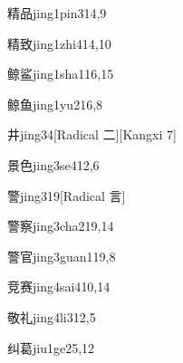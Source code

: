 \begin{verbete}{精品}{jing1pin3}{14,9}
\end{verbete}

\begin{verbete}{精致}{jing1zhi4}{14,10}
\end{verbete}

\begin{verbete}{鲸鲨}{jing1sha1}{16,15}
\end{verbete}

\begin{verbete}{鲸鱼}{jing1yu2}{16,8}
\end{verbete}

\begin{verbete}{井}{jing3}{4}[Radical 二][Kangxi 7]
\end{verbete}

\begin{verbete}{景色}{jing3se4}{12,6}
\end{verbete}

\begin{verbete}{警}{jing3}{19}[Radical 言]
\end{verbete}

\begin{verbete}{警察}{jing3cha2}{19,14}
\end{verbete}

\begin{verbete}{警官}{jing3guan1}{19,8}
\end{verbete}

\begin{verbete}{竞赛}{jing4sai4}{10,14}
\end{verbete}

\begin{verbete}{敬礼}{jing4li3}{12,5}
\end{verbete}

\begin{verbete}{纠葛}{jiu1ge2}{5,12}
\end{verbete}

